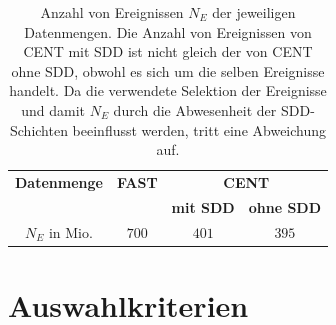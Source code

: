 \documentclass[12pt,a4paper]{report}
\begin{document}
\begin{table}
\centering
\begin{tabular}{|c|c|c|c|}
\hline
\multicolumn{1}{|c}{\textbf{Datenmenge}} & \multicolumn{1}{|c|}{\textbf{FAST}} & \multicolumn{2}{c|}{\textbf{CENT}} \\
\cline{3-4}
 &  & \textbf{mit SDD} & \textbf{ohne SDD} \\
\hline
\hline
$N_{E}$ in Mio. & $700$ & $401$ & $395$ \\ 
\hline
\end{tabular}
\caption{Anzahl von Ereignissen $N_{E}$ der jeweiligen Datenmengen. Die Anzahl von Ereignissen von CENT mit SDD ist nicht gleich der von CENT ohne SDD, obwohl es sich um die selben Ereignisse handelt. Da die verwendete Selektion der Ereignisse und damit $N_{E}$ durch die Abwesenheit der SDD-Schichten beeinflusst werden, tritt eine Abweichung auf.}
\label{tab:CENTundFAST}
\end{table} 

\section{Auswahlkriterien}
\end{document}
